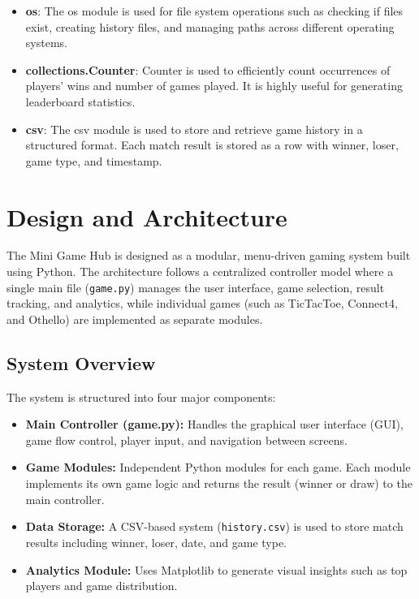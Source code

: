 \documentclass[12pt]{article}
\begin{document}
\begin{itemize}
\item \textbf{os}:  
The os module is used for file system operations such as checking if files exist, creating history files, and managing paths across different operating systems.

\item \textbf{collections.Counter}:  
Counter is used to efficiently count occurrences of players' wins and number of games played. It is highly useful for generating leaderboard statistics.

\item \textbf{csv}:  
The csv module is used to store and retrieve game history in a structured format. Each match result is stored as a row with winner, loser, game type, and timestamp.

\end{itemize}

\section{Design and Architecture}

The Mini Game Hub is designed as a modular, menu-driven gaming system built using Python. The architecture follows a centralized controller model where a single main file (\texttt{game.py}) manages the user interface, game selection, result tracking, and analytics, while individual games (such as TicTacToe, Connect4, and Othello) are implemented as separate modules.

\subsection{System Overview}

The system is structured into four major components:

\begin{itemize}
    \item \textbf{Main Controller (game.py):} Handles the graphical user interface (GUI), game flow control, player input, and navigation between screens.
    \item \textbf{Game Modules:} Independent Python modules for each game. Each module implements its own game logic and returns the result (winner or draw) to the main controller.
    \item \textbf{Data Storage:} A CSV-based system (\texttt{history.csv}) is used to store match results including winner, loser, date, and game type.
    \item \textbf{Analytics Module:} Uses Matplotlib to generate visual insights such as top players and game distribution.
\end{itemize}
\end{document}
